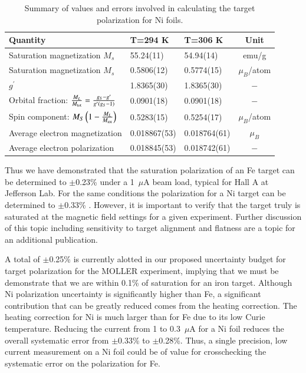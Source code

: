 \documentclass[preprint,12pt]{elsarticle}
\begin{document}
{\begin{table}[h]
\caption{\label{tab:final_errors_Ni}Summary of values and errors involved in calculating the target polarization for Ni foils.}
\begin{center}
\begin{tabular}{|l|l|l|c|}\hline
Quantity&T=294 K&T=306 K&Unit\\\hline
Saturation magnetization $M_s$ &55.24(11)&54.94(14)&emu/g\\
Saturation magnetization $M_s$&0.5806(12)&0.5774(15)&$\mu_B$/atom\\
$g^{\prime}$&1.8365(30)&1.8365(30)&$-$\\
Orbital fraction: $\frac{M_{L}}{M_{\rm tot}}=\frac{g_{S}-g^\prime}{g^\prime(g_{S}-1)}$&0.0901(18)&0.0901(18)&$-$\\
Spin component: $M_S\left(1-\frac{M_{L}}{M_{\rm tot}}\right)$&0.5283(15)&0.5254(17)&$\mu_B$/atom\\
Average electron magnetization&0.018867(53)&0.018764(61)&$\mu_B$\\
Average electron polarization&0.018845(53)&0.018742(61)&$-$\\\hline
\end{tabular}
\end{center}
\end{table}

Thus we have demonstrated that the saturation polarization of an Fe target can be determined to $\pm$0.23\% under a 1~$\mu$A beam load, typical for Hall A at Jefferson Lab. For the same conditions the polarization for a Ni target can be determined to $\pm$0.33\% . However, it is important to verify that the target truly is saturated at the magnetic field settings for a given experiment. Further discussion of this topic including sensitivity to target alignment and flatness are a topic for an additional publication. 

A total of $\pm$0.25\% is currently alotted in our proposed uncertainty budget for target polarization for the MOLLER experiment, implying that we must be demonstrate that we are within 0.1\% of saturation for an iron target.  Although Ni polarization uncertainty is significantly higher than Fe, a significant contribution that can be greatly reduced comes from the heating correction. The heating correction for Ni is much larger than for Fe due to its low Curie temperature. Reducing the current from 1 to 0.3~$\mu$A for a Ni foil reduces the overall systematic error from $\pm$0.33\% to $\pm$0.28\%. Thus, a single precision, low current measurement on a Ni foil could be of value for crosschecking the systematic error on the polarization for Fe. 


}
\end{document}
